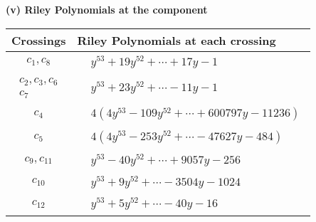 \documentclass[1p]{elsarticle_modified}
\theoremstyle{definition}
\begin{document}
\newpage\renewcommand{\arraystretch}{1}
\flushleft \textbf{(v) Riley Polynomials at the component}\newline \\
\begin{tabular}{m{50pt}|m{274pt}}
Crossings & \hspace{64pt}Riley Polynomials at each crossing \\
\hline $$\begin{aligned}c_{1},c_{8}\end{aligned}$$&$\begin{aligned}
&y^{53}+19 y^{52}+\cdots+17 y-1
\end{aligned}$\\
\hline $$\begin{aligned}c_{2},c_{3},c_{6}\\c_{7}\end{aligned}$$&$\begin{aligned}
&y^{53}+23 y^{52}+\cdots-11 y-1
\end{aligned}$\\
\hline $$\begin{aligned}c_{4}\end{aligned}$$&$\begin{aligned}
&4(4 y^{53}-109 y^{52}+\cdots+600797 y-11236)
\end{aligned}$\\
\hline $$\begin{aligned}c_{5}\end{aligned}$$&$\begin{aligned}
&4(4 y^{53}-253 y^{52}+\cdots-47627 y-484)
\end{aligned}$\\
\hline $$\begin{aligned}c_{9},c_{11}\end{aligned}$$&$\begin{aligned}
&y^{53}-40 y^{52}+\cdots+9057 y-256
\end{aligned}$\\
\hline $$\begin{aligned}c_{10}\end{aligned}$$&$\begin{aligned}
&y^{53}+9 y^{52}+\cdots-3504 y-1024
\end{aligned}$\\
\hline $$\begin{aligned}c_{12}\end{aligned}$$&$\begin{aligned}
&y^{53}+5 y^{52}+\cdots-40 y-16
\end{aligned}$\\
\hline
\end{tabular}\\~\\
\end{document}
